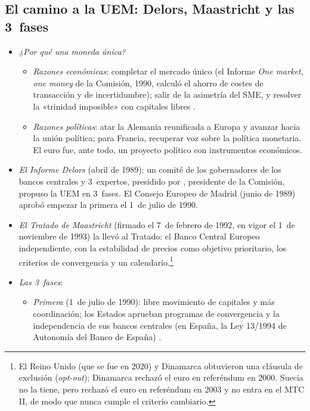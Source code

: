 \documentclass[11pt]{article}
\begin{document}
\subsection{El camino a la UEM: Delors, Maastricht y las 3~fases}\label{sec:uem}

\begin{itemize}
\item \emph{¿Por qué una moneda única?}
  \begin{itemize}
  \item \emph{Razones económicas}: completar el mercado único (el Informe \emph{One market, one money} de la Comisión, 1990, calculó el ahorro de costes de transacción y de incertidumbre)\nocite{CE1990OneMarket}; salir de la asimetría del SME, y resolver la «trinidad imposible» con capitales libres .
  \item \emph{Razones políticas}: atar la Alemania reunificada a Europa y avanzar hacia la unión política; para Francia, recuperar voz sobre la política monetaria. El euro fue, ante todo, un proyecto político con instrumentos económicos.
  \end{itemize}
\item \emph{El Informe Delors} (abril de 1989): un comité de los gobernadores de los bancos centrales y 3~expertos, presidido por , presidente de la Comisión, propuso la UEM en 3~fases\nocite{Delors1989Informe}. El Consejo Europeo de Madrid (junio de 1989) aprobó empezar la primera el 1~de julio de 1990.
\item \emph{El Tratado de Maastricht} (firmado el 7~de febrero de 1992, en vigor el 1~de noviembre de 1993) la llevó al Tratado: el Banco Central Europeo independiente, con la estabilidad de precios como objetivo prioritario, los criterios de convergencia y un calendario.\footnote{El Reino Unido (que se fue en 2020) y Dinamarca obtuvieron una cláusula de exclusión (\emph{opt-out}); Dinamarca rechazó el euro en referéndum en 2000. Suecia no la tiene, pero rechazó el euro en referéndum en 2003 y no entra en el MTC II, de modo que nunca cumple el criterio cambiario.}
\item \emph{Las 3~fases}:
  \begin{itemize}
  \item \emph{Primera} (1~de julio de 1990): libre movimiento de capitales y más coordinación; los Estados aprueban programas de convergencia y la independencia de sus bancos centrales (en España, la Ley 13/1994 de Autonomía del Banco de España) .

\end{itemize}
\end{itemize}
\end{document}
